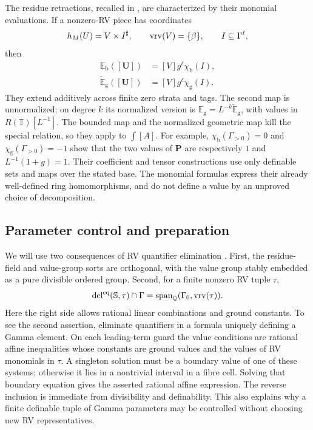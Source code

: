 \label{sec:retract}
The residue retractions, recalled in \cite[Section 4]{FY}, are characterized
by their monomial evaluations. If a nonzero-RV piece has coordinates
\[
 h_M(U)=V\times I^\sharp,\qquad
 \operatorname{vrv}(V)=\{\beta\},\qquad I\subseteq\Gamma^\ell,
\]
then
\begin{align}
 \mathbb E_{\mathrm b}([\bm U])&=[V]g^\ell\chi_{\mathrm b}(I),
 \label{eq:bounded-evaluation}\\
 \widetilde{\mathbb E}_{\mathrm g}([\bm U])
   &=[V]g^\ell\chi_{\mathrm g}(I).
 \label{eq:geometric-evaluation}
\end{align}
They extend additively across finite zero strata and tags. The second
map is unnormalized; on degree $k$ its normalized version is
$\mathbb E_{\mathrm g}=L^{-k}\widetilde{\mathbb E}_{\mathrm g}$,
with values in $R(\mathbb T)[L^{-1}]$.
The bounded map and the normalized geometric map kill the special
relation, so they apply to $\int[A]$. For example,
$\chi_{\mathrm b}(\Gamma_{>0})=0$ and
$\chi_{\mathrm g}(\Gamma_{>0})=-1$ show that the two values of
$\bm P$ are respectively $1$ and $L^{-1}(1+g)=1$.
Their coefficient and tensor constructions use only definable sets and
maps over the stated base. The monomial formulas express their already
well-defined ring homomorphisms, and do not define a value by an
unproved choice of decomposition.

\subsection{Parameter control and preparation}
We will use two consequences of RV quantifier elimination
\cite{YinQE,YinST}. First, the
residue-field and value-group sorts are orthogonal, with the value group
stably embedded as a pure divisible ordered group. Second, for a finite
nonzero RV tuple $\tau$,
\begin{equation}\label{eq:gamma-control}
 \operatorname{dcl}^{\mathrm{eq}}(\mathbb S,\tau)\cap\Gamma
 =\operatorname{span}_{\mathbb Q}
     (\Gamma_0,\operatorname{vrv}(\tau)).
\end{equation}
Here the right side allows rational linear combinations and ground
constants. To see the second assertion, eliminate quantifiers in a formula
uniquely defining a Gamma element. On each leading-term guard the value
conditions are rational affine inequalities whose constants are ground
values and the values of RV monomials in $\tau$. A singleton solution
must be a boundary value of one of these systems; otherwise it lies in
a nontrivial interval in a fibre cell. Solving that boundary equation
gives the asserted rational affine expression. The reverse inclusion
is immediate from divisibility and definability. This also explains why
a finite definable tuple of Gamma parameters may be controlled without
choosing new RV representatives.

